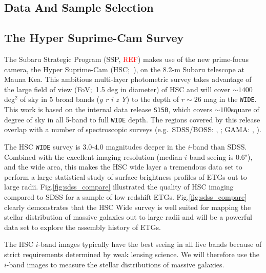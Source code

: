 \documentclass{emulateapj}
\newcommand{\addref}{{\textcolor{red}{REF}}}
\begin{document}
\begin{CJK*}{UTF8}{gbsn}
\section{Data And Sample Selection}
    \label{sec:data}

\subsection{The Hyper Suprime-Cam Survey}
    \label{ssec:hsc}

    The Subaru Strategic Program (SSP, \addref) makes use of the new prime-focus camera,
    the Hyper Suprime-Cam (HSC;~\citealt{Miyazaki2012}), on the 8.2-m Subaru telescope at 
    Mauna Kea. 
    This ambitious multi-layer photometric survey takes advantage of the large field of 
    view (FoV;~1.5 deg in diameter) of HSC and will cover $\sim 1400$ deg$^2$ of sky in 5
    broad bands (\textit{g r i z Y}) to the depth of $r \sim 26$ mag in the \texttt{WIDE}. 
    This work is based on the internal data release \texttt{S15B}, which covers 
    $\sim 100$square of degree of sky in all 5-band to full \texttt{WIDE} depth.  
    The regions covered by this release overlap with a number of spectroscopic surveys 
    (e.g.\ SDSS/BOSS: \citealt{Eisenstein2011}, \citealt{Alam2015}; 
    GAMA: \citealt{Driver2011}, \citealt{Liske2015}).

   The HSC \texttt{WIDE} survey is $3.0$-$4.0$ magnitudes deeper in the $i$-band 
    than SDSS. 
    Combined with the excellent imaging resolution (median $i$-band seeing is 0.6"), 
    and the wide area, this makes the HSC wide layer a tremendous data set to perform a 
    large statistical study of surface brightness profiles of ETGs out to large radii. 
    Fig.\ref{fig:sdss_compare} illustrated the quality of HSC imaging compared to SDSS 
    for a sample of low redshift ETGs. 
    Fig.\ref{fig:sdss_compare} clearly demonstrates that the HSC Wide survey is well 
    suited for mapping the stellar distribution of massive galaxies out to large radii 
    and will be a powerful data set to explore the assembly history of ETGs.

	The HSC $i$-band images typically have the best seeing in all five bands because of 
    strict requirements determined by weak lensing science. 
    We will therefore use the $i$-band images to measure the stellar distributions of 
    massive galaxies. 
    

\end{CJK*}
\end{document}
